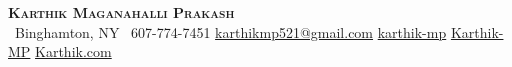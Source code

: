 \begin{center}
    \textbf{\Huge \scshape Karthik Maganahalli Prakash} \\ \vspace{1pt}
     \ \small Binghamton, NY \quad
     \ \small 607-774-7451 \quad
    \href{mailto:karthikmp521@gmail.com}{ {karthikmp521@gmail.com}} \quad
    \href{https://www.linkedin.com/in/karthik-mp}{ karthik-mp} \quad
    \href{https://github.com/Karthik-MP}{ Karthik-MP} \quad
    \href{https://karthikmp.com}{ Karthik.com} \quad
\end{center}
